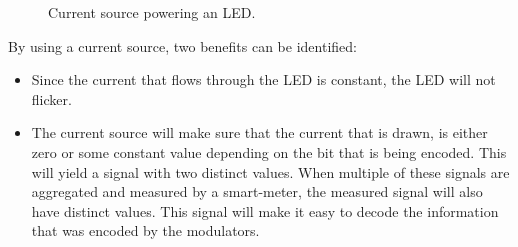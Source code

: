 \begin{figure}[!h]
\begin{minipage}[b]{0.5\textwidth}
			\caption{Current source powering an LED.}
			\label{fig:dc-led-current-source}
		\end{minipage}
	\end{figure}

	By using a current source, two benefits can be identified:

	\begin{itemize}
		
		\item Since the current that flows through the LED is constant, the LED will not flicker.

		\item The current source will make sure that the current that is drawn, is either zero or some constant value depending on the bit that is being encoded.
		This will yield a signal with two distinct values.
		When multiple of these signals are aggregated and measured by a smart-meter, the measured signal will also have distinct values.
		This signal will make it easy to decode the information that was encoded by the modulators.

	\end{itemize}